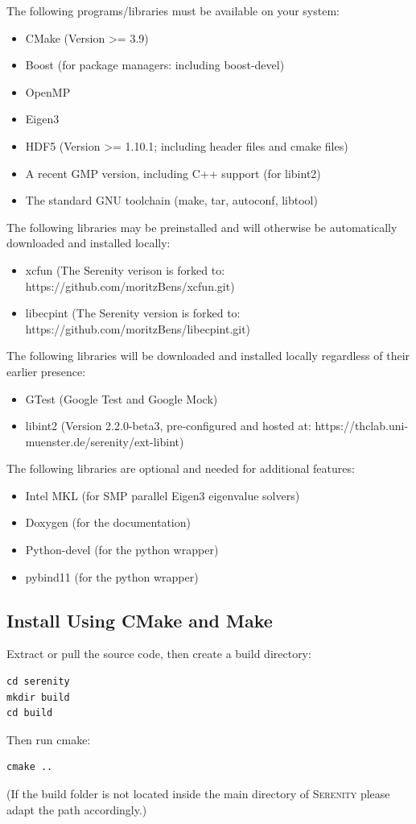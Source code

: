 \documentclass[bibliography=totocnumbered,a4paper,10pt]{scrartcl}
\begin{document}
The following programs/libraries must be available on your system:
\begin{itemize}
 \item CMake (Version >= 3.9)
 \item Boost (for package managers: including boost-devel)
 \item OpenMP
 \item Eigen3 
 \item HDF5 (Version >= 1.10.1; including header files and cmake files)
 \item A recent GMP version, including C++ support (for libint2)
 \item The standard GNU toolchain (make, tar, autoconf, libtool)  
\end{itemize} 
The following libraries may be preinstalled and will otherwise be automatically 
downloaded and installed locally:
\begin{itemize}
 \item xcfun (The Serenity verison is forked to: https://github.com/moritzBens/xcfun.git)  
 \item libecpint (The Serenity version is forked to: https://github.com/moritzBens/libecpint.git)  
\end{itemize} 
The following libraries will be downloaded and installed locally regardless of their earlier
presence:
\begin{itemize}
 \item GTest (Google Test and Google Mock)
 \item libint2 (Version 2.2.0-beta3, pre-configured and hosted at: https://thclab.uni-muenster.de/serenity/ext-libint)
\end{itemize} 
The following libraries are optional and needed for additional features:
\begin{itemize}
 \item Intel MKL (for SMP parallel Eigen3 eigenvalue solvers)
 \item Doxygen (for the documentation)
 \item Python-devel (for the python wrapper)   
 \item pybind11 (for the python wrapper)
\end{itemize} 

\subsection{Install Using CMake and Make}

Extract or pull the source code, then create a build directory:
\begin{lstlisting}
cd serenity
mkdir build  
cd build  
\end{lstlisting}
Then run cmake:
\begin{lstlisting}
cmake ..    
\end{lstlisting}
(If the build folder is not located inside the main directory of \textsc{Serenity}
please adapt the path accordingly.)
\end{document}
